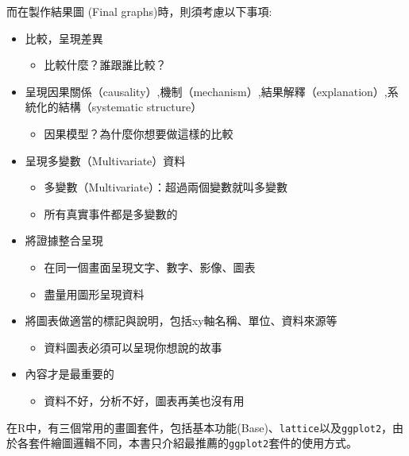 \documentclass[]{book}
\providecommand{\tightlist}{%
  \setlength{\itemsep}{0pt}\setlength{\parskip}{0pt}}
\theoremstyle{definition}
\theoremstyle{definition}
\theoremstyle{remark}
\begin{document}
而在製作結果圖 (Final graphs)時，則須考慮以下事項:

\begin{itemize}
\tightlist
\item
  比較，呈現差異

  \begin{itemize}
  \tightlist
  \item
    比較什麼？誰跟誰比較？
  \end{itemize}
\item
  呈現因果關係（causality）,機制（mechanism）,結果解釋（explanation）,系統化的結構（systematic
  structure）

  \begin{itemize}
  \tightlist
  \item
    因果模型？為什麼你想要做這樣的比較
  \end{itemize}
\item
  呈現多變數（Multivariate）資料

  \begin{itemize}
  \tightlist
  \item
    多變數（Multivariate）：超過兩個變數就叫多變數
  \item
    所有真實事件都是多變數的
  \end{itemize}
\item
  將證據整合呈現

  \begin{itemize}
  \tightlist
  \item
    在同一個畫面呈現文字、數字、影像、圖表
  \item
    盡量用圖形呈現資料
  \end{itemize}
\item
  將圖表做適當的標記與說明，包括xy軸名稱、單位、資料來源等

  \begin{itemize}
  \tightlist
  \item
    資料圖表必須可以呈現你想說的故事
  \end{itemize}
\item
  內容才是最重要的

  \begin{itemize}
  \tightlist
  \item
    資料不好，分析不好，圖表再美也沒有用
  \end{itemize}
\end{itemize}

在R中，有三個常用的畫圖套件，包括基本功能(Base)、\texttt{lattice}以及\texttt{ggplot2}，由於各套件繪圖邏輯不同，本書只介紹最推薦的\texttt{ggplot2}套件的使用方式。
\end{document}
